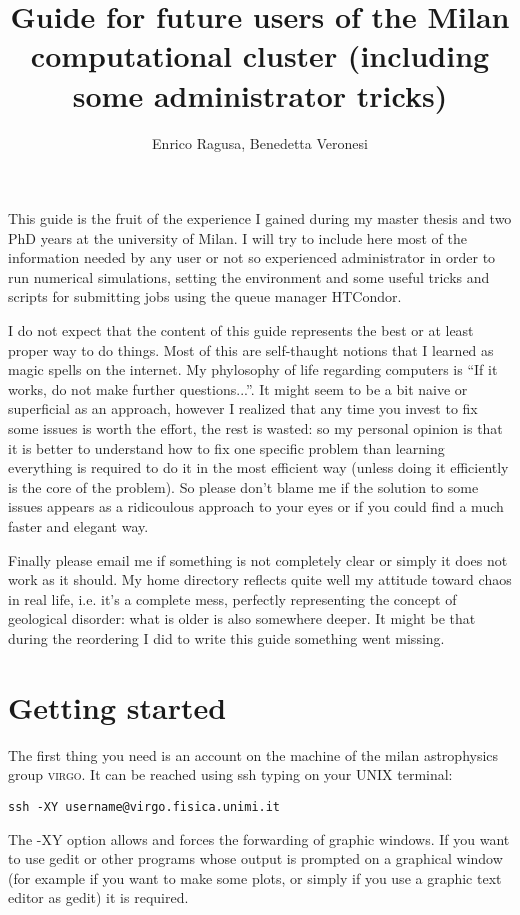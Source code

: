 \documentclass[10pt,a4paper,twoside]{article} %
\title{Guide for future users of the Milan computational cluster (including some administrator tricks)}
\author{Enrico Ragusa, Benedetta Veronesi}
\begin{document}
\maketitle

This guide is the fruit of the experience I gained during my master thesis and two PhD years at the university of Milan. I will try to include here most of the information needed by any user or not so experienced administrator in order to run numerical simulations, setting the environment and some useful tricks and scripts for submitting jobs using the queue manager HTCondor. 

I do not expect that the content of this guide represents the best or at least proper way to do things. Most of this are self-thaught notions that I learned as magic spells on the internet. My phylosophy of life regarding computers is ``If it works, do not make further questions...''. It might seem to be a bit naive or superficial as an approach, however I realized that any time you invest to fix some issues is worth the effort, the rest is wasted: so my personal opinion is that it is better to understand how to fix one specific problem than learning everything is required to do it in the most efficient way (unless doing it efficiently is the core of the problem). So please don't blame me if the solution to some issues appears as a ridicoulous approach to your eyes or if you could find a much faster and elegant way.

Finally please email me if something is not completely clear or simply it does not work as it should. My home directory reflects quite well my attitude toward chaos in real life, i.e. it's a complete mess, perfectly representing the concept of geological disorder: what is older is also somewhere deeper. It might be that during the reordering I did to write this guide something went missing.  

\section{Getting started}

The first thing you need is an account on the machine of the milan astrophysics group \textsc{virgo}. It can be reached using ssh typing on your UNIX terminal:
\begin{verbatim}
ssh -XY username@virgo.fisica.unimi.it
\end{verbatim}
The -XY option allows and forces the forwarding of graphic windows. If you want to use gedit or other programs whose output is prompted on a graphical window (for example if you want to make some plots, or simply if you use a graphic text editor as gedit) it is required. 
\end{document}

